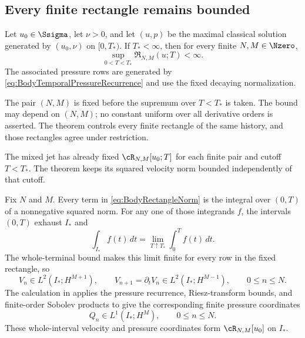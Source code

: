 \subsection{Every finite rectangle remains bounded}\label{sub:BodyCompatibleIntersection}

\begin{theorem}\label{thm:BodyWholeTerminalRectangleTheorem}
Let \(u_0\in\Ssigma\), let \(\nu>0\), and let \((u,p)\) be the maximal classical
solution generated by \((u_0,\nu)\) on \([0,T_*)\).  If \(T_*<\infty\), then for every
finite \(N,M\in\Nzero\),
\begin{equation}\label{eq:BodyWholeTerminalRectangleEstimate}
  \sup_{0<T<T_*}\mathfrak R_{N,M}(u;T)<\infty.
\end{equation}
The associated pressure rows are generated by
\eqref{eq:BodyTemporalPressureRecurrence} and use the fixed decaying normalization.
\end{theorem}

\begin{remark}
The pair \((N,M)\) is fixed before the supremum over \(T<T_*\) is taken.
The bound may depend on \((N,M)\); no constant uniform over all derivative orders is asserted.
The theorem controls every finite rectangle of the same history, and those rectangles agree under restriction.
\end{remark}

The mixed jet has already fixed \(\cR_{N,M}[u_0;T]\) for each finite pair and
cutoff \(T<T_*\).  The theorem keeps its squared velocity norm bounded independently
of that cutoff.

Fix \(N\) and \(M\).
Every term in \eqref{eq:BodyRectangleNorm} is the integral over \((0,T)\) of a nonnegative squared norm.
For any one of those integrands \(f\), the intervals \((0,T)\) exhaust \(I_*\) and
\[
  \int_{I_*}f(t)\,dt
  =
  \lim_{T\uparrow T_*}\int_0^T f(t)\,dt.
\]
The whole-terminal bound makes this limit finite for every row in the fixed rectangle, so
\begin{equation}\label{eq:BodyWholeTerminalAdjacentRows}
  V_n\in L^2(I_*;H^{M+1}),
  \qquad
  V_{n+1}=\partial_tV_n\in L^2(I_*;H^{M-1}),
  \qquad 0\leq n\leq N.
\end{equation}
The calculation in  applies the pressure recurrence, Riesz-transform bounds, and finite-order Sobolev products to give
the corresponding finite pressure coordinates
\begin{equation}\label{eq:BodyWholeTerminalPressureRows}
  Q_n\in L^1(I_*;H^M),
  \qquad 0\leq n\leq N.
\end{equation}
These whole-interval velocity and pressure coordinates form
\(\cR_{N,M}[u_0]\) on \(I_*\).


